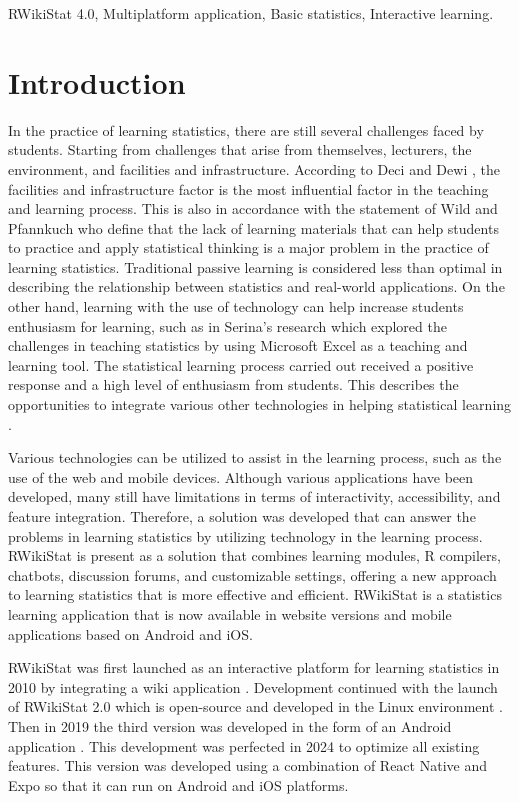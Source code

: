 \documentclass[conference,a4paper]{IEEEtran}
\begin{document}
\begin{IEEEkeywords}
  RWikiStat 4.0, Multiplatform application, Basic statistics, Interactive learning.
\end{IEEEkeywords}

\section{Introduction}
\label{sect:introduction}

In the practice of learning statistics, there are still several challenges faced by students. Starting from challenges that arise from themselves, lecturers, the environment, and facilities and infrastructure. According to Deci and Dewi \cite{b1}, the facilities and infrastructure factor is the most influential factor in the teaching and learning process. This is also in accordance with the statement of Wild and Pfannkuch \cite{b2} who define that the lack of learning materials that can help students to practice and apply statistical thinking is a major problem in the practice of learning statistics. Traditional passive learning is considered less than optimal in describing the relationship between statistics and real-world applications. On the other hand, learning with the use of technology can help increase students enthusiasm for learning, such as in Serina's research which explored the challenges in teaching statistics by using Microsoft Excel as a teaching and learning tool. The statistical learning process carried out received a positive response and a high level of enthusiasm from students. This describes the opportunities to integrate various other technologies in helping statistical learning \cite{b3}.

Various technologies can be utilized to assist in the learning process, such as the use of the web and mobile devices. Although various applications have been developed, many still have limitations in terms of interactivity, accessibility, and feature integration. Therefore, a solution was developed that can answer the problems in learning statistics by utilizing technology in the learning process. RWikiStat is present as a solution that combines learning modules, R compilers, chatbots, discussion forums, and customizable settings, offering a new approach to learning statistics that is more effective and efficient. RWikiStat is a statistics learning application that is now available in website versions and mobile applications based on Android and iOS.

RWikiStat was first launched as an interactive platform for learning statistics in 2010 by integrating a wiki application \cite{b4}. Development continued with the launch of RWikiStat 2.0 which is open-source and developed in the Linux environment \cite{b5}. Then in 2019 the third version was developed in the form of an Android application \cite{b6}. This development was perfected in 2024 to optimize all existing features. This version was developed using a combination of React Native and Expo so that it can run on Android and iOS platforms.
\end{document}
